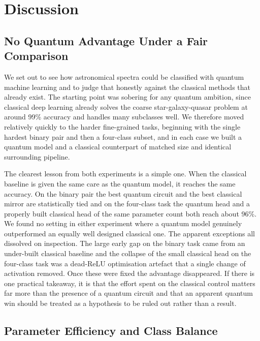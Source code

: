 \section{Discussion}
\label{sec:discussion}

\subsection{No Quantum Advantage Under a Fair Comparison}
\label{sec:disc_advantage}

We set out to see how astronomical spectra could be classified with quantum machine
learning and to judge that honestly against the classical methods that already exist.
The starting point was sobering for any quantum ambition, since classical deep learning
already solves the coarse star-galaxy-quasar problem at around 99\% accuracy and
handles many subclasses well. We therefore moved relatively quickly to the harder fine-grained tasks,
beginning with the single hardest binary pair and then a four-class subset, and in each
case we built a quantum model and a classical counterpart of matched size and identical
surrounding pipeline.

The clearest lesson from both experiments is a simple one. When the classical baseline
is given the same care as the quantum model, it reaches the same accuracy. On the
binary pair the best quantum circuit and the best classical mirror are statistically
tied and on the four-class task the quantum head and a properly built classical head
of the same parameter count both reach about 96\%. We found no setting in either
experiment where a quantum model genuinely outperformed an equally well designed
classical one. The apparent exceptions all dissolved on inspection. The large early gap
on the binary task came from an under-built classical baseline and the collapse of the
small classical head on the four-class task was a dead-ReLU optimisation artefact that a
single change of activation removed. Once these were fixed the advantage disappeared.
If there is one practical takeaway, it is that the effort spent on the classical control
matters far more than the presence of a quantum circuit and that an apparent quantum
win should be treated as a hypothesis to be ruled out rather than a result.

\subsection{Parameter Efficiency and Class Balance}
\label{sec:disc_paramatch}

